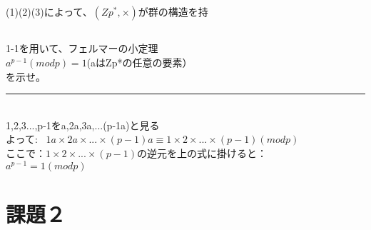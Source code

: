 \documentclass[twocolumn]{article}
\begin{document}
\begin{spacing}{1.5}
(1)(2)(3)によって、$(Zp^*,\times)$が群の構造を持

\subsection{}
1-1を用いて、フェルマーの小定理\\
$a^{p-1}(modp)=1$(aはZp*の任意の要素）\\
を示せ。\\
\hrule
~\\
{1,2,3...,p-1}を{a,2a,3a,...(p-1a)}と見る\\
よって: \ $1a\times 2a\times ...\times (p-1)a\equiv 1\times 2\times ...\times (p-1)(modp)$\\
ここで：$1\times 2\times ...\times (p-1)$の逆元を上の式に掛けると：\\
$a^{p-1}=1(modp)$\\

\end{spacing}

\section{課題２}
\end{document}
